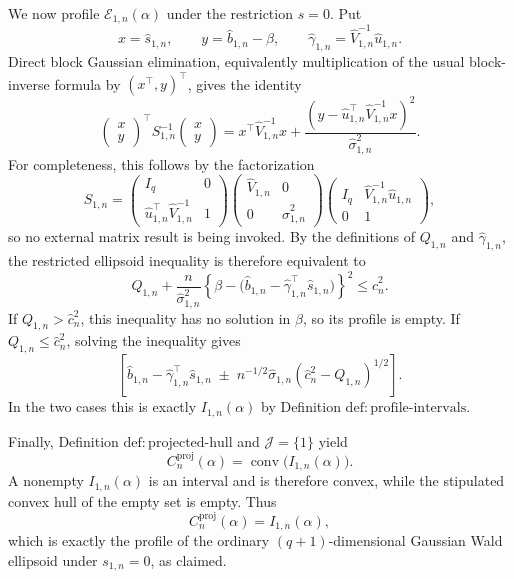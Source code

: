 We now profile \(\mathcal E_{1,n}(\alpha)\) under the restriction \(s=0\).  Put
\[
 x=\widehat s_{1,n},\qquad
 y=\widehat b_{1,n}-\beta,\qquad
 \widehat\gamma_{1,n}=\widehat V_{1,n}^{-1}\widehat u_{1,n}.
\]
Direct block Gaussian elimination, equivalently multiplication of the usual block-inverse formula by \((x^{\top},y)^{\top}\), gives the identity
\[
 \begin{pmatrix}x\\y\end{pmatrix}^{\!\top}
 S_{1,n}^{-1}
 \begin{pmatrix}x\\y\end{pmatrix}
 =x^{\top}\widehat V_{1,n}^{-1}x
  +\frac{(y-\widehat u_{1,n}^{\top}
                    \widehat V_{1,n}^{-1}x)^2}
         {\widehat\sigma_{1,n}^{2}}.
\]
For completeness, this follows by the factorization
\[
 S_{1,n}
 =\begin{pmatrix}I_q&0\\
       \widehat u_{1,n}^{\top}\widehat V_{1,n}^{-1}&1
   \end{pmatrix}
   \begin{pmatrix}\widehat V_{1,n}&0\\0&\widehat\sigma_{1,n}^{2}\end{pmatrix}
   \begin{pmatrix}I_q&\widehat V_{1,n}^{-1}\widehat u_{1,n}\\0&1
   \end{pmatrix},
\]
so no external matrix result is being invoked.  By the definitions of \(Q_{1,n}\) and \(\widehat\gamma_{1,n}\), the restricted ellipsoid inequality is therefore equivalent to
\[
 Q_{1,n}
 +\frac{n}{\widehat\sigma_{1,n}^{2}}
  \left\{\beta-
  \bigl(\widehat b_{1,n}
        -\widehat\gamma_{1,n}^{\top}\widehat s_{1,n}\bigr)
  \right\}^{2}
 \le \widehat c_n^2.
\]
If \(Q_{1,n}>\widehat c_n^2\), this inequality has no solution in \(\beta\), so its profile is empty.  If \(Q_{1,n}\le\widehat c_n^2\), solving the inequality gives
\[
 \left[
 \widehat b_{1,n}-\widehat\gamma_{1,n}^{\top}\widehat s_{1,n}
 \;\mathbin{\pm}\;
 n^{-1/2}\widehat\sigma_{1,n}
       (\widehat c_n^2-Q_{1,n})^{1/2}
 \right].
\]
In the two cases this is exactly \(I_{1,n}(\alpha)\) by Definition \(\mathrm{def:profile\text{-}intervals}\).

Finally, Definition \(\mathrm{def:projected\text{-}hull}\) and \(\mathcal J=\{1\}\) yield
\[
 C_n^{\mathrm{proj}}(\alpha)
   =\operatorname{conv}\bigl(I_{1,n}(\alpha)\bigr).
\]
A nonempty \(I_{1,n}(\alpha)\) is an interval and is therefore convex, while the stipulated convex hull of the empty set is empty.  Thus
\[
 C_n^{\mathrm{proj}}(\alpha)=I_{1,n}(\alpha),
\]
which is exactly the profile of the ordinary \((q+1)\)-dimensional Gaussian Wald ellipsoid under \(s_{1,n}=0\), as claimed.
